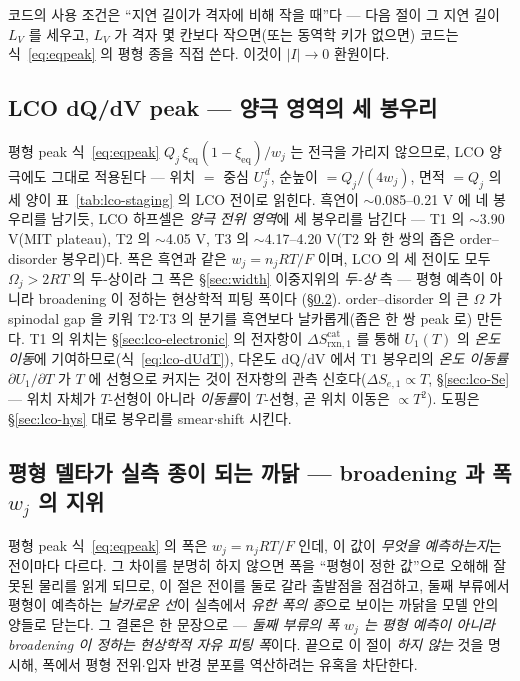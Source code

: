 \documentclass[11pt,a4paper]{article}
\newcommand{\eq}{\mathrm{eq}}
\newcommand{\rxn}{\mathrm{rxn}}
\begin{document}
코드의 사용 조건은 ``지연 길이가 격자에 비해 작을 때''다 — 다음 절이 그 지연 길이 $L_V$ 를 세우고, $L_V$ 가 격자
몇 칸보다 작으면(또는 동역학 키가 없으면) 코드는 식~\eqref{eq:eqpeak} 의 평형 종을 직접 쓴다. 이것이 $|I|\to0$ 환원이다.

\subsection{LCO dQ/dV peak — 양극 영역의 세 봉우리}\label{sec:lco-peak}
평형 peak 식~\eqref{eq:eqpeak} $Q_j\,\xi_\eq(1-\xi_\eq)/w_j$ 는 전극을 가리지 않으므로, LCO 양극에도 그대로 적용된다 —
위치 $=$ 중심 $U_j^{\,d}$, 순높이 $=Q_j/(4w_j)$, 면적 $=Q_j$ 의 세 양이 표~\ref{tab:lco-staging} 의 LCO 전이로 읽힌다.
흑연이 $\sim$0.085--0.21 V 에 네 봉우리를 남기듯, LCO 하프셀은 \emph{양극 전위 영역}에 세 봉우리를 남긴다 — T1 의
$\sim$3.90 V(MIT plateau), T2 의 $\sim$4.05 V, T3 의 $\sim$4.17--4.20 V(T2 와 한 쌍의 좁은 order--disorder 봉우리)다.
폭은 흑연과 같은 $w_j=n_jRT/F$ 이며, LCO 의 세 전이도 모두 $\Omega_j>2RT$ 의 두-상이라 그 폭은
\S\ref{sec:width} 이중지위의 \emph{두-상} 측 — 평형 예측이 아니라 broadening 이 정하는 현상학적 피팅 폭이다
(\S\ref{sec:broadening}). order--disorder 의 큰 $\Omega$ 가 spinodal gap 을 키워 T2$\cdot$T3 의 분기를 흑연보다
날카롭게(좁은 한 쌍 peak 로) 만든다. T1 의 위치는 \S\ref{sec:lco-electronic} 의 전자항이
$\Delta S_{\rxn,1}^\mathrm{cat}$ 를 통해 $U_1(T)$ 의 \emph{온도 이동}에 기여하므로(식~\eqref{eq:lco-dUdT}), 다온도
dQ/dV 에서 T1 봉우리의 \emph{온도 이동률} $\partial U_1/\partial T$ 가 $T$ 에 선형으로 커지는 것이 전자항의 관측
신호다($\Delta S_{e,1}\propto T$, \S\ref{sec:lco-Se} — 위치 자체가 $T$-선형이 아니라 \emph{이동률}이 $T$-선형, 곧 위치
이동은 $\propto T^2$). 도핑은 \S\ref{sec:lco-hys} 대로 봉우리를 smear$\cdot$shift 시킨다.

\subsection{평형 델타가 실측 종이 되는 까닭 — broadening 과 폭 $w_j$ 의 지위}\label{sec:broadening}
평형 peak 식~\eqref{eq:eqpeak} 의 폭은 $w_j=n_jRT/F$ 인데, 이 값이 \emph{무엇을 예측하는지}는 전이마다 다르다.
그 차이를 분명히 하지 않으면 폭을 ``평형이 정한 값''으로 오해해 잘못된 물리를 읽게 되므로, 이 절은 전이를 둘로 갈라
출발점을 점검하고, 둘째 부류에서 평형이 예측하는 \emph{날카로운 선}이 실측에서 \emph{유한 폭의 종}으로 보이는 까닭을
모델 안의 양들로 닫는다. 그 결론은 한 문장으로 — \emph{둘째 부류의 폭 $w_j$ 는 평형 예측이 아니라 broadening 이 정하는
현상학적 자유 피팅 폭}이다. 끝으로 이 절이 \emph{하지 않는} 것을 명시해, 폭에서 평형 전위$\cdot$입자 반경 분포를
역산하려는 유혹을 차단한다.
\end{document}
